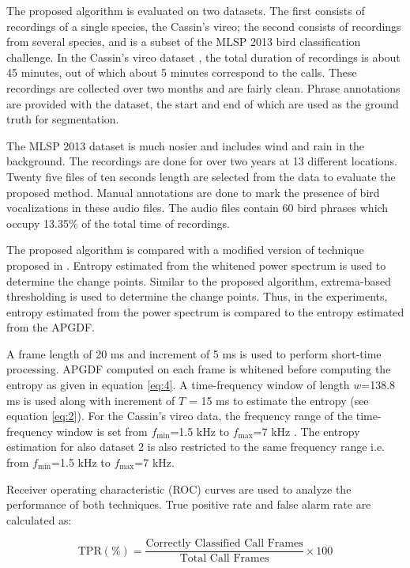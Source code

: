 \documentclass[a4paper]{article}
\begin{document}
The proposed algorithm is evaluated on two datasets. The first consists of
recordings of a single species, the Cassin's vireo; the second consists of
recordings from several species, and is a subset of the MLSP 2013 bird
classification challenge.
In the Cassin's vireo dataset \cite{data1}, the total duration
of recordings is about 45 minutes, out of which about 5 minutes correspond to
the calls. These recordings are collected over two months and are fairly clean.
Phrase annotations are provided with the dataset, the start and end of which
are used as the ground truth for segmentation. 

The MLSP 2013 dataset \cite{data2} is much nosier and includes wind and rain in
the background. The recordings are done for over two years at 13 different
locations. Twenty five files of ten seconds length are selected from the data to
evaluate the proposed method.  
Manual annotations are done to mark the presence
of bird vocalizations in these audio files. The audio files contain 60 bird phrases which occupy 13.35\% of the total time of recordings.  


The proposed algorithm is compared with a modified version of technique proposed
in \cite{wang2013}. Entropy estimated from the whitened power spectrum is used
to determine the change points. Similar to the proposed algorithm, extrema-based
thresholding is used to determine the change points. Thus, in the experiments,
entropy estimated from the power spectrum is compared to the entropy estimated
from the APGDF.
 
A frame length of 20 ms and increment of 5 ms is used to perform short-time
processing. APGDF computed on each frame is whitened before computing the
entropy as given in equation \ref{eq:4}. A time-frequency window of length $w$=138.8 ms
is used along with increment of $T$ = 15 ms to estimate the entropy (see
equation \ref{eq:2}). For the Cassin's vireo data, the frequency range of the
time-frequency window is set from $f_{\min}$=1.5 kHz to $f_{\max}$=7 kHz
\cite{wang2013}. The entropy estimation for also dataset 2 is also restricted to the same frequency range i.e. from $f_{\min}$=1.5 kHz to $f_{\max}$=7 kHz. 

Receiver operating characteristic (ROC) curves are used to analyze the
performance of both techniques. True positive rate and false alarm rate are
calculated as:

\begin{equation}
\text{TPR} (\%)=\frac{\text{Correctly Classified Call Frames}} {\text{Total Call Frames}} \times 100 
\end{equation}
\end{document}
